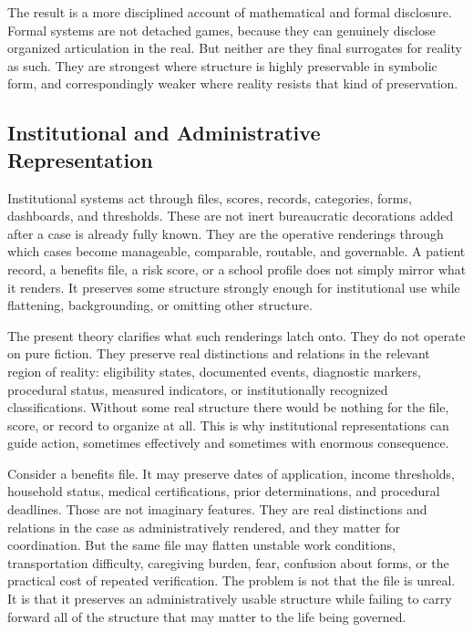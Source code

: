 \documentclass[11pt]{article}
\begin{document}
The result is a more disciplined account of mathematical and formal disclosure. Formal systems are not detached games, because they can genuinely disclose organized articulation in the real. But neither are they final surrogates for reality as such. They are strongest where structure is highly preservable in symbolic form, and correspondingly weaker where reality resists that kind of preservation.

\subsection{Institutional and Administrative Representation}

Institutional systems act through files, scores, records, categories, forms, dashboards, and thresholds. These are not inert bureaucratic decorations added after a case is already fully known. They are the operative renderings through which cases become manageable, comparable, routable, and governable. \cite{BowkerStar1999SortingThingsOut} A patient record, a benefits file, a risk score, or a school profile does not simply mirror what it renders. It preserves some structure strongly enough for institutional use while flattening, backgrounding, or omitting other structure.

The present theory clarifies what such renderings latch onto. They do not operate on pure fiction. They preserve real distinctions and relations in the relevant region of reality: eligibility states, documented events, diagnostic markers, procedural status, measured indicators, or institutionally recognized classifications. Without some real structure there would be nothing for the file, score, or record to organize at all. This is why institutional representations can guide action, sometimes effectively and sometimes with enormous consequence.

Consider a benefits file. It may preserve dates of application, income thresholds, household status, medical certifications, prior determinations, and procedural deadlines. Those are not imaginary features. They are real distinctions and relations in the case as administratively rendered, and they matter for coordination. But the same file may flatten unstable work conditions, transportation difficulty, caregiving burden, fear, confusion about forms, or the practical cost of repeated verification. The problem is not that the file is unreal. It is that it preserves an administratively usable structure while failing to carry forward all of the structure that may matter to the life being governed.
\end{document}

